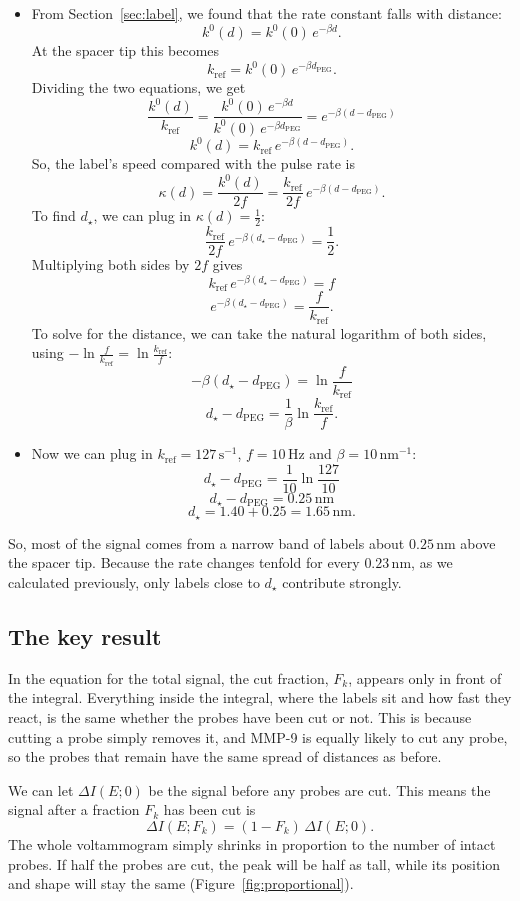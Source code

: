 \documentclass[10pt,a4paper]{article}
\numberwithin{equation}{section}
\newcommand{\nm}{\,\mathrm{nm}}
\newcommand{\dpeg}{d_{\mathrm{PEG}}}
\newcommand{\kref}{k_{\mathrm{ref}}}
\newcommand{\dropdown}{\par\medskip}
\begin{document}
\dropdown
\begin{itemize}
  \item From Section~\ref{sec:label}, we found that the rate constant falls with distance:
  \[ k^0(d) = k^0(0)\,e^{-\beta d}. \]
  At the spacer tip this becomes
  \[ \kref = k^0(0)\,e^{-\beta\dpeg}. \]
  Dividing the two equations, we get
  \[ \frac{k^0(d)}{\kref} = \frac{k^0(0)\,e^{-\beta d}}{k^0(0)\,e^{-\beta\dpeg}} = e^{-\beta(d-\dpeg)} \]
  \[ k^0(d) = \kref\,e^{-\beta(d-\dpeg)}. \]
  So, the label's speed compared with the pulse rate is
  \[ \kappa(d) = \frac{k^0(d)}{2f} = \frac{\kref}{2f}\,e^{-\beta(d-\dpeg)}. \]
  To find $d_\star$, we can plug in $\kappa(d) = \frac12$:
  \[ \frac{\kref}{2f}\,e^{-\beta(d_\star-\dpeg)} = \frac12. \]
  Multiplying both sides by $2f$ gives
  \[ \kref\,e^{-\beta(d_\star-\dpeg)} = f \]
  \[ e^{-\beta(d_\star-\dpeg)} = \frac{f}{\kref}. \]
  To solve for the distance, we can take the natural logarithm of both sides, using $-\ln\frac{f}{\kref} = \ln\frac{\kref}{f}$:
  \[ -\beta(d_\star - \dpeg) = \ln\frac{f}{\kref} \]
  \[ d_\star - \dpeg = \frac1\beta\ln\frac{\kref}{f}. \]
  \item Now we can plug in $\kref = 127\,\mathrm{s^{-1}}$, $f = 10\,\mathrm{Hz}$ and $\beta = 10\,\mathrm{nm^{-1}}$:
  \[ d_\star - \dpeg = \frac{1}{10}\ln\frac{127}{10} \]
  \[ d_\star - \dpeg = 0.25\nm \]
  \[ d_\star = 1.40 + 0.25 = 1.65\nm. \]
\end{itemize}

So, most of the signal comes from a narrow band of labels about $0.25\nm$ above the spacer tip. Because the rate changes tenfold for every $0.23\nm$, as we calculated previously, only labels close to $d_\star$ contribute strongly.

\subsection{The key result}
In the equation for the total signal, the cut fraction, $F_k$, appears only in front of the integral. Everything inside the integral, where the labels sit and how fast they react, is the same whether the probes have been cut or not. This is because cutting a probe simply removes it, and MMP-9 is equally likely to cut any probe, so the probes that remain have the same spread of distances as before.

We can let $\Delta I(E;0)$ be the signal before any probes are cut. This means the signal after a fraction $F_k$ has been cut is
\[ \Delta I(E;F_k) = (1 - F_k)\,\Delta I(E;0). \]
The whole voltammogram simply shrinks in proportion to the number of intact probes. If half the probes are cut, the peak will be half as tall, while its position and shape will stay the same (Figure~\ref{fig:proportional}).
\end{document}
